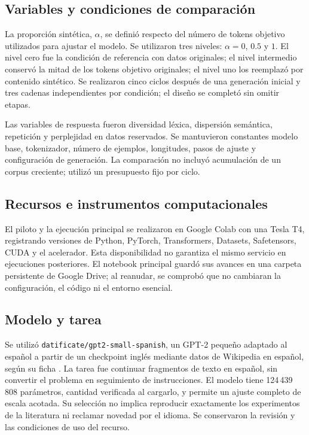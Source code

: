 \documentclass[12pt,letterpaper]{article}
\begin{document}
\subsection{Variables y condiciones de comparación}

La proporción sintética, \(\alpha\), se definió respecto del número de
tokens objetivo utilizados para ajustar el modelo. Se utilizaron tres niveles:
\(\alpha=0\), \(0.5\) y \(1\). El nivel cero fue la condición de referencia
con datos originales; el nivel intermedio conservó la mitad de los tokens
objetivo originales; el nivel uno los reemplazó por contenido sintético.
Se realizaron cinco ciclos después de una generación inicial y tres cadenas
independientes por condición; el diseño se completó sin omitir etapas.

Las variables de respuesta fueron diversidad léxica, dispersión semántica,
repetición y perplejidad en datos reservados. Se mantuvieron constantes
modelo base, tokenizador, número de ejemplos, longitudes, pasos de ajuste
y configuración de generación. La comparación no incluyó acumulación de
un corpus creciente; utilizó un presupuesto fijo por ciclo.

\subsection{Recursos e instrumentos computacionales}

El piloto y la ejecución principal se realizaron en Google Colab con una
Tesla T4, registrando versiones de Python, PyTorch, Transformers, Datasets,
Safetensors, CUDA y el acelerador. Esta disponibilidad no garantiza el
mismo servicio en ejecuciones posteriores. El notebook principal guardó
sus avances en una carpeta persistente de Google Drive; al reanudar, se
comprobó que no cambiaran la configuración, el código ni el entorno esencial.

\subsection{Modelo y tarea}

Se utilizó \texttt{datificate/gpt2-small-spanish}, un GPT-2 pequeño
adaptado al español a partir de un checkpoint inglés mediante datos de
Wikipedia en español, según su ficha \cite{spanishmodelcard}. La tarea
fue continuar fragmentos de texto en español, sin convertir el problema
en seguimiento de instrucciones. El modelo tiene 124\,439\,808 parámetros,
cantidad verificada al cargarlo, y permite un ajuste completo de escala
acotada. Su selección no implica reproducir exactamente los
experimentos de la literatura ni reclamar novedad por el idioma.
Se conservaron la revisión y las condiciones de uso del recurso.
\end{document}
